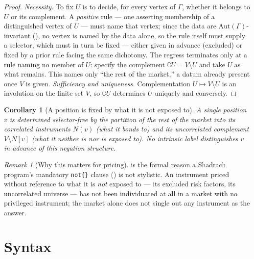 \documentclass[11pt,a4paper]{article}
\theoremstyle{thmstyle}
\newtheorem{corollary}[theorem]{Corollary}
\theoremstyle{definition}
\theoremstyle{remark}
\newtheorem{remark}[theorem]{Remark}
\newcommand{\Gph}{\Gamma}
\newcommand{\V}{V}
\newcommand{\co}{\complement}
\newcommand{\sh}[1]{\texttt{#1}}
\begin{document}
\begin{proof}
\emph{Necessity.} To fix $U$ is to decide, for every vertex of $\Gph$,
whether it belongs to $U$ or its complement. A \emph{positive} rule ---
one asserting membership of a distinguished vertex of $U$ --- must name
that vertex; since the data are $\mathrm{Aut}(\Gph)$-invariant
(), no vertex is named by the data alone, so the rule
itself must supply a selector, which must in turn be fixed --- either
given in advance (excluded) or fixed by a prior rule facing the same
dichotomy. The regress terminates only at a rule naming no member of
$U$: specify the complement $\co U=\V\setminus U$ and take $U$ as what
remains. This names only ``the rest of the market,'' a datum already
present once $\V$ is given. \emph{Sufficiency and uniqueness.}
Complementation $U\mapsto\V\setminus U$ is an involution on the finite
set $\V$, so $\co U$ determines $U$ uniquely and conversely.
\end{proof}

\begin{corollary}[A position is fixed by what it is not exposed to]
\label{cor:position-negation}
A single position $v$ is determined selector-free by the partition of
the rest of the market into its correlated instruments $N(v)$ (what it
bonds to) and its uncorrelated complement $\V\setminus N[v]$ (what it
neither is nor is exposed to). No intrinsic label distinguishes $v$
in advance of this negation structure.
\end{corollary}

\begin{remark}[Why this matters for pricing]
\label{rem:negation-pricing}
 is the formal reason a Shadrach program's mandatory
\sh{not\{\}} clause () is not stylistic. An instrument
priced without reference to what it is \emph{not} exposed to --- its
excluded risk factors, its uncorrelated universe --- has not been
individuated at all in a market with no privileged instrument; the
market alone does not single out any instrument as the answer.
\end{remark}

\part{Syntax}

\end{document}
